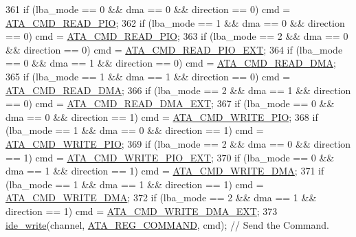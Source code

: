 \begin{DoxyCode}
361     \textcolor{keywordflow}{if} (lba\_mode == 0 && dma == 0 && direction == 0) cmd = \hyperlink{a00023_a91a96db8427a8caa254a218f05dcb3f4_a91a96db8427a8caa254a218f05dcb3f4}{ATA\_CMD\_READ\_PIO};
362     \textcolor{keywordflow}{if} (lba\_mode == 1 && dma == 0 && direction == 0) cmd = \hyperlink{a00023_a91a96db8427a8caa254a218f05dcb3f4_a91a96db8427a8caa254a218f05dcb3f4}{ATA\_CMD\_READ\_PIO};   
363     \textcolor{keywordflow}{if} (lba\_mode == 2 && dma == 0 && direction == 0) cmd = \hyperlink{a00023_a3165497b4d8eb30297a4d62e39846b01_a3165497b4d8eb30297a4d62e39846b01}{ATA\_CMD\_READ\_PIO\_EXT};   
364     \textcolor{keywordflow}{if} (lba\_mode == 0 && dma == 1 && direction == 0) cmd = \hyperlink{a00023_aefab351e75e10b6dbfa0b7828031cda4_aefab351e75e10b6dbfa0b7828031cda4}{ATA\_CMD\_READ\_DMA};
365     \textcolor{keywordflow}{if} (lba\_mode == 1 && dma == 1 && direction == 0) cmd = \hyperlink{a00023_aefab351e75e10b6dbfa0b7828031cda4_aefab351e75e10b6dbfa0b7828031cda4}{ATA\_CMD\_READ\_DMA};
366     \textcolor{keywordflow}{if} (lba\_mode == 2 && dma == 1 && direction == 0) cmd = \hyperlink{a00023_a42247550c708b2b7852927180c7dde78_a42247550c708b2b7852927180c7dde78}{ATA\_CMD\_READ\_DMA\_EXT};
367     \textcolor{keywordflow}{if} (lba\_mode == 0 && dma == 0 && direction == 1) cmd = \hyperlink{a00023_a64f2c50b916f1f67018c36f75f811cc7_a64f2c50b916f1f67018c36f75f811cc7}{ATA\_CMD\_WRITE\_PIO};
368     \textcolor{keywordflow}{if} (lba\_mode == 1 && dma == 0 && direction == 1) cmd = \hyperlink{a00023_a64f2c50b916f1f67018c36f75f811cc7_a64f2c50b916f1f67018c36f75f811cc7}{ATA\_CMD\_WRITE\_PIO};
369     \textcolor{keywordflow}{if} (lba\_mode == 2 && dma == 0 && direction == 1) cmd = \hyperlink{a00023_ac8e433782c7125e6929673907eca6f17_ac8e433782c7125e6929673907eca6f17}{ATA\_CMD\_WRITE\_PIO\_EXT};
370     \textcolor{keywordflow}{if} (lba\_mode == 0 && dma == 1 && direction == 1) cmd = \hyperlink{a00023_a41dc931ac3c2c6733a2a67d03eaf1674_a41dc931ac3c2c6733a2a67d03eaf1674}{ATA\_CMD\_WRITE\_DMA};
371     \textcolor{keywordflow}{if} (lba\_mode == 1 && dma == 1 && direction == 1) cmd = \hyperlink{a00023_a41dc931ac3c2c6733a2a67d03eaf1674_a41dc931ac3c2c6733a2a67d03eaf1674}{ATA\_CMD\_WRITE\_DMA};
372     \textcolor{keywordflow}{if} (lba\_mode == 2 && dma == 1 && direction == 1) cmd = \hyperlink{a00023_a3a75d9e39518e704f3a4b39e6a3d998c_a3a75d9e39518e704f3a4b39e6a3d998c}{ATA\_CMD\_WRITE\_DMA\_EXT};
373     \hyperlink{a00023_afdb22c37a32d86fcb64e55b3edab4790_afdb22c37a32d86fcb64e55b3edab4790}{ide\_write}(channel, \hyperlink{a00023_a1a54069e05845badff84e1490ca4681e_a1a54069e05845badff84e1490ca4681e}{ATA\_REG\_COMMAND}, cmd);               \textcolor{comment}{// Send the Command.}

\end{DoxyCode}
